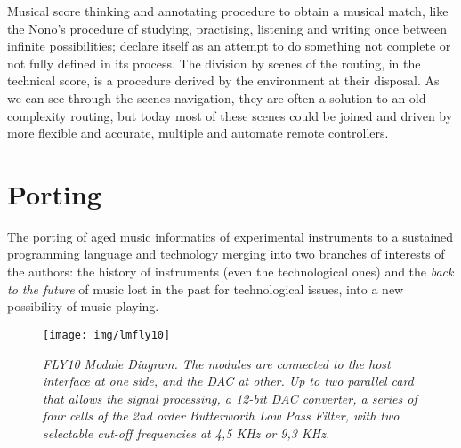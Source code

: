 \documentclass[twoside,a4paper]{article}
\begin{document}
Musical score thinking and annotating procedure to obtain a musical match, like the Nono's procedure of studying, practising, listening and writing once between infinite possibilities; declare itself as an attempt to do something not complete or not fully defined in its process. The division by scenes of the routing, in the technical score, is a procedure derived by the environment at their disposal. As we can see through the scenes navigation, they are often a solution to an old-complexity routing, but today most of these scenes could be joined and driven by more flexible and accurate, multiple and automate remote controllers.



\section{Porting}
\label{sec:porting}

The porting of aged music informatics of experimental instruments to a sustained programming language and technology merging into two branches of interests of the authors: the history of instruments (even the technological ones) and the \emph{back to the future} of music lost in the past for technological issues, into a new possibility of music playing.

\begin{figure}[ht]
\centerline{\texttt{[image: img/lmfly10]}}
\caption{\label{ml-fly10}{\it \emph{FLY10} Module Diagram. The modules are connected to the host interface at one side, and the DAC at other. Up to two parallel card that allows the signal processing, a 12-bit DAC converter, a series of four cells of the 2nd order Butterworth Low Pass Filter, with two selectable cut-off frequencies at 4,5 KHz or 9,3 KHz.
}}
\end{figure}
\end{document}

